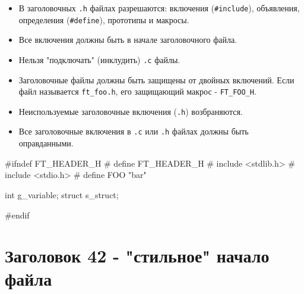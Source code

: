 \documentclass{42-ru}
\begin{document}
        \begin{itemize}

            \item В заголовочных \texttt{.h} файлах разрешаются: включения (\texttt{#include}), объявления, определения (\texttt{#define}), прототипы и макросы.

            \item Все включения должны быть в начале заголовочного файла.

            \item Нельзя "подключать" (инклудить) \texttt{.с} файлы.

            \item Заголовочные файлы должны быть защищены от двойных включений. Если файл называется \texttt{ft\_foo.h}, его защищающий макрос - \texttt{FT\_FOO\_H}.

            \item Неиспользуемые заголовочные включения (\texttt{.h}) возбраняются.

            \item Все заголовочные включения в \texttt{.c} или \texttt{.h} файлах должны быть оправданными.

        \end{itemize}

        \begin{42ccode}
#ifndef FT_HEADER_H
# define FT_HEADER_H
# include <stdlib.h>
# include <stdio.h>
# define FOO "bar"

int		g_variable;
struct	s_struct;

#endif
        \end{42ccode}

    \newpage


   \section{Заголовок 42 - "стильное" начало файла}
\end{document}
